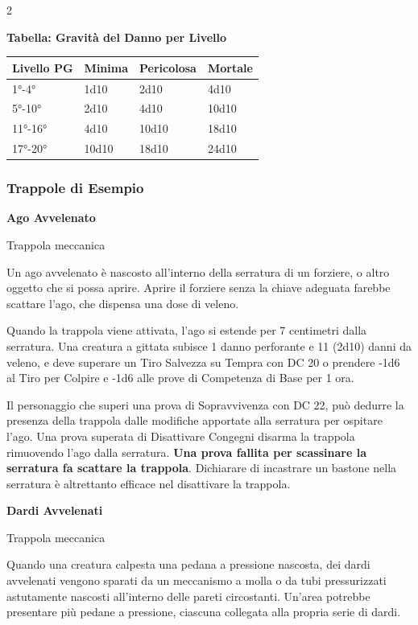 \begin{multicols}{2}
\medskip

\textbf{Tabella: Gravità del Danno per Livello}

\medskip

\noindent\begin{tabularx}{\linewidth}{X|X|X|X}
	\toprule
\rowcolor{gray!20}Livello PG&Minima&Pericolosa&Mortale\\
\toprule
1°-4°&1d10&2d10&4d10\\
\rowcolor{gray!20}5°-10°&2d10&4d10&10d10\\
11°-16°&4d10&10d10&18d10\\
\rowcolor{gray!20}17°-20°&10d10&18d10&24d10
\end{tabularx}

\medskip

\subsubsection{Trappole di Esempio}\hypertarget{trappoleesempio}{}\label{trappoleesempio}
\textbf{Ago Avvelenato}

Trappola meccanica

Un ago avvelenato è nascosto all'interno della serratura di un forziere, o altro oggetto che si possa aprire. Aprire il forziere senza la chiave adeguata farebbe scattare l'ago, che dispensa una dose di veleno.

Quando la trappola viene attivata, l'ago si estende per 7 centimetri dalla serratura. Una creatura a gittata subisce 1 danno perforante e 11 (2d10) danni da veleno, e deve superare un Tiro Salvezza su Tempra con DC 20 o prendere -1d6 al Tiro per Colpire e -1d6 alle prove di Competenza di Base per 1 ora.

Il personaggio che superi una prova di Sopravvivenza con DC 22, può dedurre la presenza della trappola dalle modifiche apportate alla serratura per ospitare l'ago. Una prova superata di Disattivare Congegni disarma la trappola rimuovendo l'ago dalla serratura. \textbf{Una prova fallita per scassinare la serratura fa scattare la trappola}. Dichiarare di incastrare un bastone nella serratura è altrettanto efficace nel disattivare la trappola.

\medskip

\textbf{Dardi Avvelenati}

Trappola meccanica

Quando una creatura calpesta una pedana a pressione nascosta, dei dardi avvelenati vengono sparati da un meccanismo a molla o da tubi pressurizzati astutamente nascosti all'interno delle pareti circostanti. Un'area potrebbe presentare più pedane a pressione, ciascuna collegata alla propria serie di dardi.


\end{multicols}

